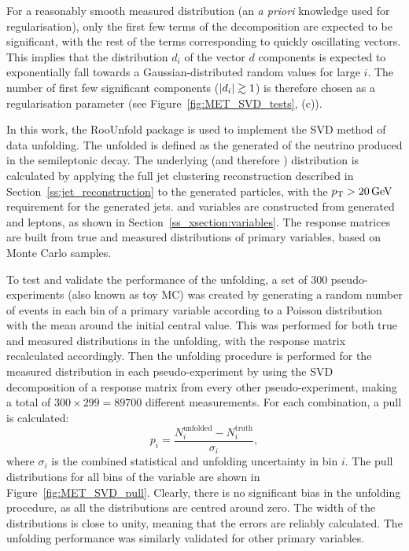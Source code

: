 For a reasonably smooth measured distribution (an \textit{a priori} knowledge used for regularisation), only the first
few terms of the decomposition are expected to be significant, with the rest of the terms corresponding to quickly
oscillating vectors. This implies that the distribution $d_i$ of the vector $d$ components is expected to exponentially
fall towards a Gaussian-distributed random values for large $i$. The number of first few significant components ($\lvert d_i \rvert \gtrsim 1$) is therefore chosen as a regularisation parameter (see Figure~\ref{fig:MET_SVD_tests}, (c)).

In this work, the RooUnfold package \autocite{RooUnfold} is used to implement the SVD method of data unfolding. The
unfolded \MET is defined as the generated \pt of the neutrino produced in the semileptonic \ttbar decay. The underlying
\HT (and therefore \ST) distribution is calculated by applying the full jet clustering reconstruction described in
Section~\ref{ss:jet_reconstruction} to the generated particles, with the $\pt > \SI{20}{\GeV}$ requirement for the
generated jets. \MT and \WPT variables are constructed from generated \MET and leptons, as shown in
Section~\ref{ss_xsection:variables}. The response matrices are built from true and measured distributions of primary
variables, based on \ttbar Monte Carlo samples.

To test and validate the performance of the unfolding, a set of 300 pseudo-experiments (also known as toy MC) was
created by generating a random number of events in each bin of a primary variable according to a Poisson distribution
with the mean around the initial central value. This was performed for both true and measured distributions in the
unfolding, with the response matrix recalculated accordingly. Then the unfolding procedure is performed for the
measured distribution in each pseudo-experiment by using the SVD decomposition of a response matrix from every other
pseudo-experiment, making a total of $300 \times 299 = 89700$ different measurements. For each combination, a pull
is calculated:
\begin{equation}
p_i = \frac{N_i^{\text{unfolded}} -N_i^{\text{truth}} }{\sigma_i},
\end{equation}
where $\sigma_i$ is the combined statistical and unfolding uncertainty in bin $i$. The pull distributions for all bins
of the \MET variable are shown in Figure~\ref{fig:MET_SVD_pull}. Clearly, there is no significant bias in the unfolding
procedure, as all the distributions are centred around zero. The width of the distributions is close to unity, meaning
that the errors are reliably calculated. The unfolding performance was similarly validated for other primary variables.

